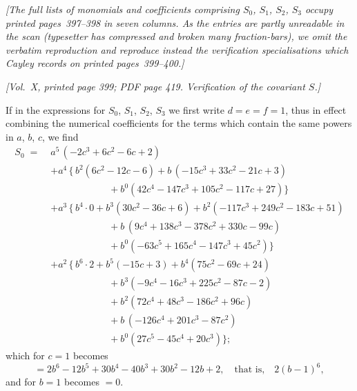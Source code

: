 \documentclass[11pt]{article}
\begin{document}
\medskip

\noindent\textit{[The full lists of monomials and coefficients comprising $S_{0}$, $S_{1}$, $S_{2}$, $S_{3}$ occupy printed pages~397--398 in seven columns. As the entries are partly unreadable in the scan (typesetter has compressed and broken many fraction-bars), we omit the verbatim reproduction and reproduce instead the verification specialisations which Cayley records on printed pages~399--400.]}

\newpage

\noindent\textit{[Vol.~X, printed page 399; PDF page 419. Verification of the covariant $S$.]}

\medskip

If in the expressions for $S_{0}$, $S_{1}$, $S_{2}$, $S_{3}$ we first write $d = e = f = 1$, thus in effect combining the numerical coefficients for the terms which contain the same powers in $a$, $b$, $c$, we find
\begin{align*}
S_{0} \;=\;& a^{5}\,(-2c^{3}+6c^{2}-6c+2) \\
&+ a^{4}\,\bigl\{\,b^{2}(6c^{2}-12c-6) + b\,(-15c^{3}+33c^{2}-21c+3) \\
&\hspace{6em} + b^{0}(42c^{4}-147c^{3}+105c^{2}-117c+27)\bigr\} \\
&+ a^{3}\,\bigl\{\,b^{4}\!\cdot 0 + b^{3}(30c^{2}-36c+6) + b^{2}(-117c^{3}+249c^{2}-183c+51) \\
&\hspace{6em} + b\,(9c^{4}+138c^{3}-378c^{2}+330c-99c) \\
&\hspace{6em} + b^{0}(-63c^{5}+165c^{4}-147c^{3}+45c^{2})\bigr\} \\
&+ a^{2}\,\bigl\{\,b^{6}\!\cdot 2 + b^{5}(-15c+3) + b^{4}(75c^{2}-69c+24) \\
&\hspace{6em} + b^{3}(-9c^{4}-16c^{3}+225c^{2}-87c-2) \\
&\hspace{6em} + b^{2}(72c^{4}+48c^{3}-186c^{2}+96c) \\
&\hspace{6em} + b\,(-126c^{4}+201c^{3}-87c^{2}) \\
&\hspace{6em} + b^{0}(27c^{5}-45c^{4}+20c^{3})\bigr\};
\end{align*}
which for $c = 1$ becomes
\[
= 2b^{6} - 12b^{5} + 30b^{4} - 40b^{3} + 30b^{2} - 12b + 2, \quad\text{that is,}\quad 2(b-1)^{6},
\]
and for $b = 1$ becomes $= 0$.
\end{document}
